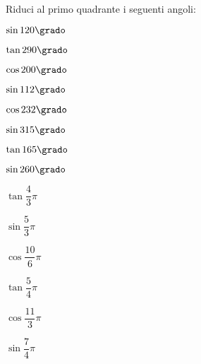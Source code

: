 \begin{esercizio}\label{ese:03.1}
Riduci al primo quadrante i seguenti angoli:
\begin{multicols}{4}
 \begin{enumeratea}
  \item $\sin 120 \grado$
   \hfill
  \item $\tan 290 \grado$
   \hfill
  \item $\cos 200 \grado$ 
   \hfill
  \item $\sin 112 \grado$ 
   \hfill
  \item $\cos 232 \grado$ 
   \hfill
  \item $\sin 315 \grado$ 
   \hfill
  \item $\tan 165 \grado$ 
   \hfill
  \item $\sin 260 \grado$ 
   \hfill
  \item $\tan \dfrac{4}{3}\pi$ 
   \hfill
  \item $\sin \dfrac{5}{3}\pi$ 
   \hfill
  \item $\cos \dfrac{10}{6}\pi$ 
   \hfill
  \item $\tan \dfrac{5}{4}\pi$ 
   \hfill
  \item $\cos \dfrac{11}{3}\pi$ 
   \hfill
  \item $\sin \dfrac{7}{4}\pi$ 
   \hfill
 \end{enumeratea}
 \end{multicols}
\end{esercizio}

\subsubsection*{}

